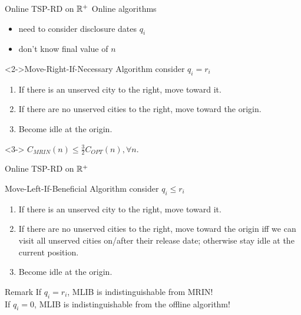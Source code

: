 \documentclass{beamer}
\begin{document}
\begin{frame}{Online TSP-RD on $\Bbb{R}^+$}
  Online algorithms
  \begin{itemize}
    \item need to consider disclosure dates $q_i$
    \item don't know final value of $n$
  \end{itemize}
  \vspace{5pt}

  \begin{block}<2->{Move-Right-If-Necessary Algorithm}
    consider $q_i=r_i$
    \begin{enumerate}
      \item If there is an unserved city to the right, move toward it.
      \item If there are no unserved cities to the right, move toward the origin.
      \item Become idle at the origin.
    \end{enumerate}
  \end{block}

  \begin{Theorem}<3->
    $C_{MRIN}(n) \le \frac {3}{2} C_{OPT}(n), \forall n$.
  \end{Theorem}

\end{frame}

\begin{frame}{Online TSP-RD on $\Bbb{R}^+$}

  \begin{block}{Move-Left-If-Beneficial Algorithm}
    consider $q_i \le r_i$
    \begin{enumerate}
      \item If there is an unserved city to the right, move toward it.
      \item If there are no unserved cities to the right, move toward the origin \alert{iff} we can visit all unserved cities on/after their release date; otherwise stay idle at the current position.
      \item Become idle at the origin.
    \end{enumerate}
  \end{block}

  \begin{block}{Remark}
    If $q_i = r_i$, MLIB is indistinguishable from MRIN!\\
    If $q_i = 0$, MLIB is indistinguishable from the offline algorithm!
  \end{block}

\end{frame}
\end{document}
